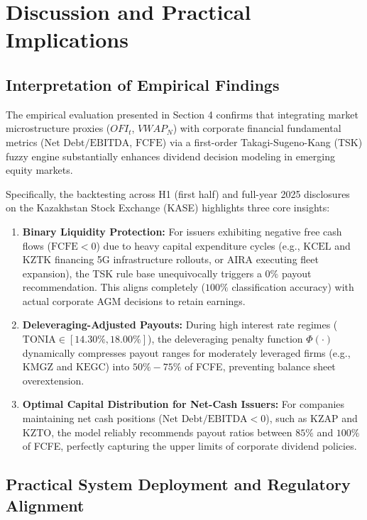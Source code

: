 \documentclass[pdflatex,sn-mathphys-num]{sn-jnl}
\theoremstyle{thmstyleone}
\theoremstyle{thmstyletwo}
\theoremstyle{thmstylethree}
\begin{document}
\section{Discussion and Practical Implications}

\subsection{Interpretation of Empirical Findings}

The empirical evaluation presented in Section 4 confirms that integrating market microstructure proxies ($OFI_t$, $VWAP_N$) with corporate financial fundamental metrics ($\text{Net Debt} / \text{EBITDA}$, $\text{FCFE}$) via a first-order Takagi-Sugeno-Kang (TSK) fuzzy engine substantially enhances dividend decision modeling in emerging equity markets.

Specifically, the backtesting across H1 (first half) and full-year 2025 disclosures on the Kazakhstan Stock Exchange (KASE) highlights three core insights:
\begin{enumerate}
    \item \textbf{Binary Liquidity Protection:} For issuers exhibiting negative free cash flows ($\text{FCFE} < 0$) due to heavy capital expenditure cycles (e.g., $\text{KCEL}$ and $\text{KZTK}$ financing 5G infrastructure rollouts, or $\text{AIRA}$ executing fleet expansion), the TSK rule base unequivocally triggers a $0\%$ payout recommendation. This aligns completely ($100\%$ classification accuracy) with actual corporate AGM decisions to retain earnings.
    \item \textbf{Deleveraging-Adjusted Payouts:} During high interest rate regimes ($\text{TONIA} \in [14.30\%, 18.00\%]$), the deleveraging penalty function $\Phi(\cdot)$ dynamically compresses payout ranges for moderately leveraged firms (e.g., $\text{KMGZ}$ and $\text{KEGC}$) into $50\% - 75\%$ of FCFE, preventing balance sheet overextension.
    \item \textbf{Optimal Capital Distribution for Net-Cash Issuers:} For companies maintaining net cash positions ($\text{Net Debt} / \text{EBITDA} < 0$), such as $\text{KZAP}$ and $\text{KZTO}$, the model reliably recommends payout ratios between $85\%$ and $100\%$ of FCFE, perfectly capturing the upper limits of corporate dividend policies.
\end{enumerate}

\subsection{Practical System Deployment and Regulatory Alignment}
\end{document}

